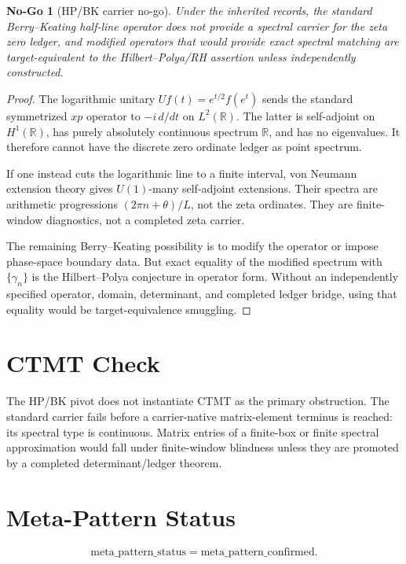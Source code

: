 \documentclass[11pt]{article}
\newtheorem{nogo}{No-Go}
\newcommand{\R}{\mathbb R}
\begin{document}
\begin{nogo}[HP/BK carrier no-go]
Under the inherited records, the standard Berry--Keating half-line operator
does not provide a spectral carrier for the zeta zero ledger, and modified
operators that would provide exact spectral matching are target-equivalent to
the Hilbert--Polya/RH assertion unless independently constructed.
\end{nogo}

\begin{proof}
The logarithmic unitary \(Uf(t)=e^{t/2}f(e^t)\) sends the standard
symmetrized \(xp\) operator to \(-i\,d/dt\) on \(L^2(\R)\).  The latter is
self-adjoint on \(H^1(\R)\), has purely absolutely continuous spectrum
\(\R\), and has no eigenvalues.  It therefore cannot have the discrete zero
ordinate ledger as point spectrum.

If one instead cuts the logarithmic line to a finite interval, von Neumann
extension theory gives \(U(1)\)-many self-adjoint extensions.  Their spectra
are arithmetic progressions \((2\pi n+\theta)/L\), not the zeta ordinates.
They are finite-window diagnostics, not a completed zeta carrier.

The remaining Berry--Keating possibility is to modify the operator or impose
phase-space boundary data.  But exact equality of the modified spectrum with
\(\{\gamma_n\}\) is the Hilbert--Polya conjecture in operator form.  Without
an independently specified operator, domain, determinant, and completed
ledger bridge, using that equality would be target-equivalence smuggling.
\end{proof}

\section*{CTMT Check}

The HP/BK pivot does not instantiate CTMT as the primary obstruction.  The
standard carrier fails before a carrier-native matrix-element terminus is
reached: its spectral type is continuous.  Matrix entries of a finite-box or
finite spectral approximation would fall under finite-window blindness unless
they are promoted by a completed determinant/ledger theorem.

\section*{Meta-Pattern Status}

\[
\boxed{\mathrm{meta\_pattern\_status}=\text{meta\_pattern\_confirmed}.}
\]
\end{document}

